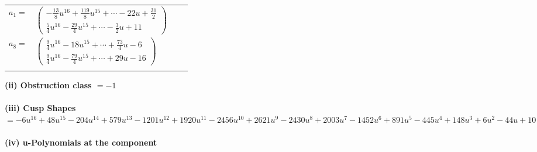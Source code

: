 \documentclass[1p]{elsarticle_modified}
\theoremstyle{definition}
\begin{document}
\begin{tabular}{m{7pt} m{180pt} m{7pt} m{180pt} }
\flushright $a_{1}=$&$\begin{pmatrix}-\frac{13}{8} u^{16}+\frac{119}{8} u^{15}+\cdots-22 u+\frac{31}{2}\\\frac{5}{4} u^{16}-\frac{29}{4} u^{15}+\cdots-\frac{3}{2} u+11\end{pmatrix}$ \\
\flushright $a_{8}=$&$\begin{pmatrix}\frac{9}{4} u^{16}-18 u^{15}+\cdots+\frac{73}{4} u-6\\\frac{9}{4} u^{16}-\frac{79}{4} u^{15}+\cdots+29 u-16\end{pmatrix}$\\&\end{tabular}
\flushleft \textbf{(ii) Obstruction class $= -1$}\\~\\
\flushleft \textbf{(iii) Cusp Shapes $= -6 u^{16}+48 u^{15}-204 u^{14}+579 u^{13}-1201 u^{12}+1920 u^{11}-2456 u^{10}+2621 u^9-2430 u^8+2003 u^7-1452 u^6+891 u^5-445 u^4+148 u^3+6 u^2-44 u+10$}\\~\\
\newpage\renewcommand{\arraystretch}{1}
\flushleft \textbf{(iv) u-Polynomials at the component}\newline \\
\end{document}
